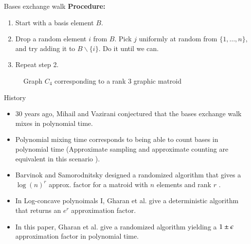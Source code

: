 \documentclass[10pt]{beamer}
\begin{document}
\begin{frame}{Bases exchange walk}
    \textbf{Procedure:}\begin{enumerate}
        \item Start with a basis element $B$. 
        \item Drop a random element $i$ from $B$. Pick $j$ uniformly at random from $\{1,\hdots, n\}$, and try adding it to $B\backslash\{i\}$. Do it until we can.
        \item Repeat step 2.
    \end{enumerate}
    \vspace{3pt}

    \begin{figure}
        \centering
        \caption{Graph $C_4$ corresponding to a rank 3 graphic matroid}
    \end{figure}
\end{frame}

\begin{frame}{History}
    \begin{itemize}
        \item 30 years ago, Mihail and Vazirani conjectured that the bases exchange walk mixes in polynomial time. 
        \item Polynomial mixing time corresponds to being able to count bases in polynomial time (Approximate sampling and approximate counting are equivalent in this scenario \cite[JVV86]{JVV86}).  
        \item Barvinok and Samorodnitsky designed a randomized algorithm that gives a $\log(n)^r$ approx. factor for a matroid with $n$ elements and rank $r$ \cite[BS07]{BS07}. 
        \item In Log-concave polynoimals I, Gharan et al. give a deterministic algorithm that returns an $e^r$ approximation factor.\cite[AKOV18]{AKOV18}
        \item In this paper, Gharan et al. give a randomized algorithm yielding a $1 \pm \epsilon$ approximation factor in polynomial time.
    \end{itemize}
\end{frame}
\end{document}
